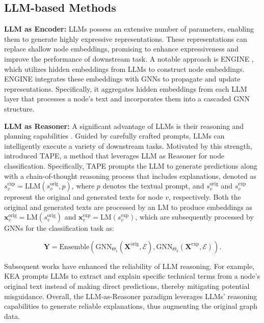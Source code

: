 \subsection{LLM-based Methods}
\textbf{LLM as Encoder: }LLMs possess an extensive number of parameters, enabling them to generate highly expressive representations. These representations can replace shallow node embeddings, promising to enhance expressiveness and improve the performance of downstream task. A notable approach is ENGINE \cite{Zhu2024ENGINE}, which utilizes hidden embeddings from LLMs to construct node embeddings. ENGINE integrates these embeddings with GNNs to propagate and update representations. Specifically, it aggregates hidden embeddings from each LLM layer that processes a node's text and incorporates them into a cascaded GNN structure.


\textbf{LLM as Reasoner: }A significant advantage of LLMs is their reasoning and planning capabilities \cite{luo2024rog, wu2024graph}. Guided by carefully crafted prompts, LLMs can intelligently execute a variety of downstream tasks. Motivated by this strength, \citet{he2023TAPE} introduced TAPE, a method that leverages LLM as Reasoner for node classification. Specifically, TAPE prompts the LLM to generate predictions along with a chain-of-thought reasoning process that includes explanations, denoted as $s_v^{\text{exp}} = \text{LLM}(s_v^{\text{orig}}, p)$, where $p$ denotes the textual prompt, and $s_v^{\text{orig}}$ and $s_v^{\text{exp}}$ represent the original and generated texts for node $v$, respectively. Both the original and generated texts are processed by an LM to produce embeddings as $\bm{x}_v^{\text{orig}} = \text{LM}(s_v^{\text{orig}})$ and $\bm{x}_v^{\text{exp}} = \text{LM}(s_v^{\text{exp}})$, which are subsequently processed by GNNs for the classification task as: 

\begin{equation*}
    \bm{Y} = \text{Ensemble}( \text{GNN}_{\Theta_1}(\bm{X}^{\text{orig}}, \mathcal{E}),  \text{GNN}_{\Theta_2}(\bm{X}^{\text{exp}}, \mathcal{E})).
\end{equation*}

Subsequent works have enhanced the reliability of LLM reasoning. For example, KEA \cite{chen2024exploring} prompts LLMs to extract and explain specific technical terms from a node's original text instead of making direct predictions, thereby mitigating potential misguidance. Overall, the LLM-as-Reasoner paradigm leverages LLMs' reasoning capabilities to generate reliable explanations, thus augmenting the original graph data.


